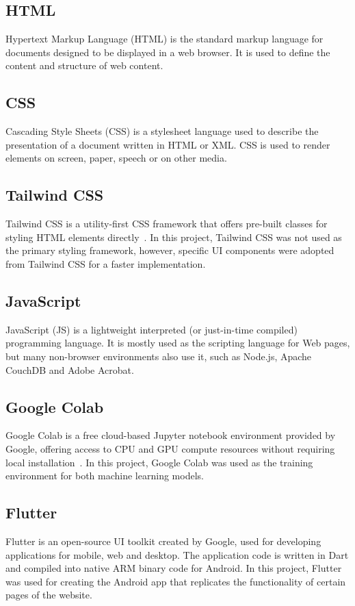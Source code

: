 \subsection*{HTML}

Hypertext Markup Language (HTML) is the standard markup language for documents designed to be
displayed in a web browser. It is used to define the content and structure of web content.

\subsection*{CSS}

Cascading Style Sheets (CSS) is a stylesheet language used to describe the presentation of a
document written in HTML or XML. CSS is used to render elements on screen, paper, speech or on
other media.

\subsection*{Tailwind CSS}

Tailwind CSS is a utility-first CSS framework that offers pre-built classes for styling HTML
elements directly~\cite{tailwind}. In this project, Tailwind CSS was not used as the primary
styling framework, however, specific UI components were adopted from Tailwind CSS for a faster
implementation.

\subsection*{JavaScript}

JavaScript (JS) is a lightweight interpreted (or just-in-time compiled) programming language.
It is mostly used as the scripting language for Web pages, but many non-browser environments
also use it, such as Node.js, Apache CouchDB and Adobe Acrobat.

\subsection*{Google Colab}

Google Colab is a free cloud-based Jupyter notebook environment provided by Google, offering
access to CPU and GPU compute resources without requiring local
installation~\cite{googlecolab}. In this project, Google Colab was used as the training
environment for both machine learning models.

\subsection*{Flutter}

Flutter is an open-source UI toolkit created by Google, used for developing applications for
mobile, web and desktop. The application code is written in Dart and compiled into native ARM
binary code for Android. In this project, Flutter was used for creating the \airnest{} Android
app that replicates the functionality of certain pages of the website.
